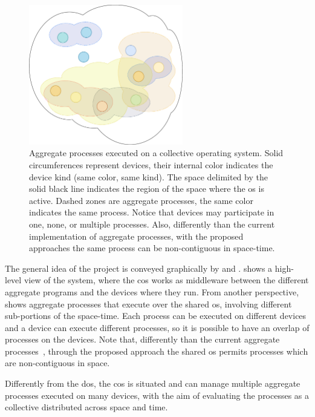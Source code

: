 \documentclass[12pt, a4paper]{article}
\begin{document}
\begin{figure}[h!]
    \centering
    \includegraphics[width=0.6\textwidth]{figures/processes}
    \caption{
        Aggregate processes executed on a collective operating system.
        Solid circumferences represent devices, their internal color indicates the device kind
        (same color, same kind).
        The space delimited by the solid black line indicates the region of the space where the
        \ac{os} is active.
        Dashed zones are aggregate processes,
        the same color indicates the same process.
        Notice that devices may participate in one, none, or multiple processes.
        Also, differently than the current implementation of aggregate processes,
        with the proposed approaches the same process can be non-contiguous in space-time.
    }\label{fig:processes}
\end{figure}

The general idea of the project is conveyed graphically by
 and .
%
 shows a high-level view of the system,
where the \ac{cos} works as middleware between the different aggregate programs and the devices where they run.
%
From another perspective,
 shows aggregate processes that execute over the shared \ac{os},
involving different sub-portions of the space-time.
%
Each process can be executed on different devices and a device can execute different processes,
so it is possible to have an overlap of processes on the devices.
%
Note that, differently than the current aggregate processes~\cite{EAAI2020-processes},
through the proposed approach the shared \ac{os} permits processes which are non-contiguous in space.

Differently from the \ac{dos},
the \ac{cos} is situated and can manage multiple aggregate processes executed on many devices,
with the aim of evaluating the processes as a collective distributed across space and time.
\end{document}
